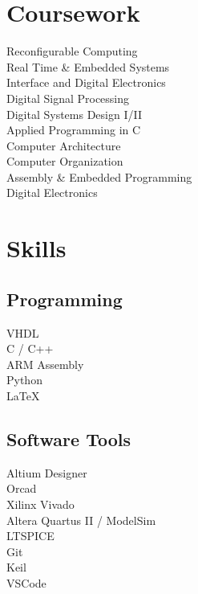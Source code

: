 \documentclass[]{deedy-resume-openfont}
\begin{document}
\begin{minipage}[t]{0.33\textwidth}

\section{Coursework}
Reconfigurable Computing \\
Real Time \& Embedded Systems \\
Interface and Digital Electronics \\
Digital Signal Processing \\
Digital Systems Design I/II \\
Applied Programming in C \\
Computer Architecture \\
Computer Organization \\
Assembly \& Embedded Programming \\
Digital Electronics \\
\sectionsep


\section{Skills}
\subsection{Programming}


VHDL \\ C / C++ \\ ARM Assembly \\ Python \\  
LaTeX \\


\sectionsep

\subsection{Software Tools}
Altium Designer \\
Orcad \\
Xilinx Vivado \\
Altera Quartus II / ModelSim\\ 
LTSPICE\\
Git\\
Keil\\
VSCode\\
\sectionsep


\end{minipage}
\end{document}
